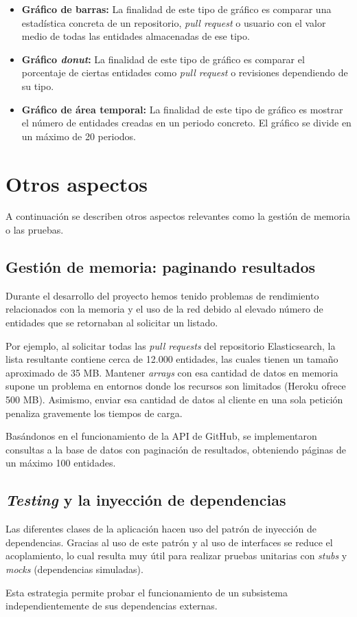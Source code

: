\begin{itemize}
\tightlist
	\item \textbf{Gráfico de barras:} La finalidad de este tipo de gráfico es comparar una estadística concreta de un repositorio, \emph{pull request} o usuario con el valor medio de todas las entidades almacenadas de ese tipo.
	\item \textbf{Gráfico \emph{donut}:} La finalidad de este tipo de gráfico es comparar el porcentaje de ciertas entidades como \emph{pull request} o revisiones dependiendo de su tipo.
	\item \textbf{Gráfico de área temporal:} La finalidad de este tipo de gráfico es mostrar  el número de entidades creadas en un periodo concreto. El gráfico se divide en un máximo de 20 periodos.
\end{itemize}



\section{Otros aspectos}

A continuación se describen otros aspectos relevantes como la gestión de memoria o las pruebas.

\subsection{Gestión de memoria: paginando resultados}

Durante el desarrollo del proyecto hemos tenido problemas de rendimiento relacionados con la memoria y el uso de la red debido al elevado número de entidades que se retornaban al solicitar un listado.

Por ejemplo, al solicitar todas las \emph{pull requests} del repositorio Elasticsearch, la lista resultante contiene cerca de 12.000 entidades, las cuales tienen un tamaño aproximado de 35 MB. Mantener \emph{arrays} con esa cantidad de datos en memoria supone un problema en entornos donde los recursos son limitados (Heroku ofrece 500 MB). Asimismo, enviar esa cantidad de datos al cliente en una sola petición penaliza gravemente los tiempos de carga.

Basándonos en el funcionamiento de la API de GitHub, se implementaron consultas a la base de datos con paginación de resultados, obteniendo páginas de un máximo 100 entidades.

\subsection{\emph{Testing} y la inyección de dependencias}

Las diferentes clases de la aplicación hacen uso del patrón de inyección de dependencias. Gracias al uso de este patrón y al uso de interfaces se reduce el acoplamiento, lo cual resulta muy útil para realizar pruebas unitarias con \emph{stubs} y \emph{mocks} (dependencias simuladas).

Esta estrategia permite probar el funcionamiento de un subsistema independientemente de sus dependencias externas.

